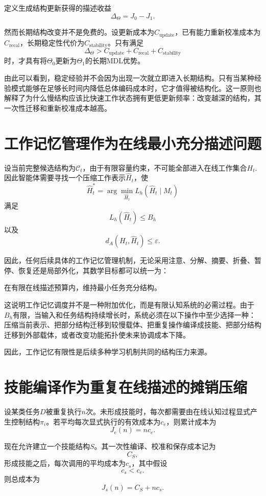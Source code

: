 定义生成结构更新获得的描述收益
\[
\boxed{
\Delta_\Theta
=
J_0-J_1.
}
\]

然而长期结构改变并不是免费的。设更新成本为$C_{\mathrm{update}}$，已有能力重新校准成本为$C_{\mathrm{recal}}$，长期稳定性代价为$C_{\mathrm{stability}}$。只有满足
\[
\boxed{
\Delta_\Theta
>
C_{\mathrm{update}}
+
C_{\mathrm{recal}}
+
C_{\mathrm{stability}}
}
\]
时，才具有将$\Theta_0$更新为$\Theta_1$的长期MDL优势。

由此可以看到，稳定经验并不会因为出现一次就立即进入长期结构。只有当某种经验模式能够在足够长时间内降低总体编码成本时，它才值得被结构化。这一原则也解释了为什么慢结构应该比快速工作状态拥有更低更新频率：改变越深的结构，其一次性迁移和重新校准成本越高。

\section{工作记忆管理作为在线最小充分描述问题}

设当前完整候选结构为$\mathcal{C}_t$，由于有限容量约束，不可能全部进入在线工作集合$H_t$. 因此智能体需要寻找一个压缩工作表示$\hat H_t$，使
\[
\boxed{
\hat H_t^*
=
\arg\min_{\hat H_t}
L_h(\hat H_t\mid M_t)
}
\]
满足
\[
L_h(\hat H_t)\leq B_h
\]
以及
\[
d_A(H_t,\hat H_t)\leq\varepsilon.
\]

因此，任何后续具体的工作记忆管理机制，无论采用注意、分解、摘要、折叠、暂停、恢复还是局部外化，其数学目标都可以统一为：

\begin{statementbox}
在有限在线描述预算内，维持最小任务充分结构。
\end{statementbox}

这说明工作记忆调度并不是一种附加优化，而是有限认知系统的必需过程。由于$B_h$有限，当输入和任务结构持续增长时，系统必须在以下操作中至少选择一种：压缩当前表示、把部分结构迁移到较慢载体、把重复操作编译成技能、把部分结构迁移到外部载体，或者改变功能拓扑使未来协调成本下降。

因此，工作记忆有限性是后续多种学习机制共同的结构压力来源。

\section{技能编译作为重复在线描述的摊销压缩}

设某类任务$D$被重复执行$n$次。未形成技能时，每次都需要由在线认知过程显式产生控制结构$\pi_i$。若平均每次显式执行的有效成本为$c_e$，则累计成本为
\[
J_e(n)
=
nc_e.
\]

现在允许建立一个技能结构$S$。其一次性编译、校准和保存成本记为
\[
C_S,
\]
形成技能之后，每次调用的平均成本为$c_s$，其中假设
\[
c_s<c_e.
\]
则总成本为
\[
J_s(n)
=
C_S
+
nc_s.
\]

